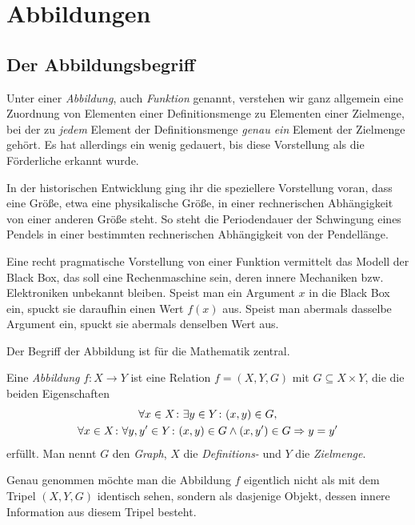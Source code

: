 \newpage
\section{Abbildungen}

\subsection{Der Abbildungsbegriff}

Unter einer \emph{Abbildung}, auch \emph{Funktion}%
 genannt, verstehen wir ganz allgemein eine Zuordnung von
Elementen einer Definitionsmenge zu Elementen einer Zielmenge, bei der
zu \emph{jedem} Element der Definitionsmenge \emph{genau ein} Element
der Zielmenge gehört. Es hat allerdings ein wenig gedauert, bis
diese Vorstellung als die Förderliche erkannt wurde.

In der historischen Entwicklung ging ihr die speziellere Vorstellung
voran, dass eine Größe, etwa eine physikalische Größe, in einer
rechnerischen Abhängigkeit von einer anderen Größe steht. So steht
die Periodendauer der Schwingung eines Pendels in einer bestimmten
rechnerischen Abhängigkeit von der Pendellänge.

Eine recht pragmatische Vorstellung von einer Funktion vermittelt das Modell
der Black Box, das soll eine Rechenmaschine sein, deren innere Mechaniken
bzw. Elektroniken unbekannt bleiben. Speist man ein Argument $x$ in die
Black Box ein, spuckt sie daraufhin einen Wert $f(x)$ aus. Speist man
abermals dasselbe Argument ein, spuckt sie abermals denselben Wert aus.

Der Begriff der Abbildung ist für die Mathematik zentral.

\begin{Definition}[Abbildung]\newlinefirst
Eine \emph{Abbildung} $f\colon X\to Y$ ist eine Relation $f=(X,Y,G)$ mit
$G\subseteq X\times Y$, die die beiden Eigenschaften
\begin{gather*}
\forall x\in X\colon\exists y\in Y\colon (x,y)\in G,\\
\forall x\in X\colon\forall y,y'\in Y\colon (x,y)\in G\land (x,y')\in G\Rightarrow y=y'
\end{gather*}
erfüllt. Man nennt $G$ den \emph{Graph}, $X$ die \emph{Definitions-} und
$Y$ die \emph{Zielmenge}.
\end{Definition}
Genau genommen möchte man die Abbildung $f$ eigentlich nicht als mit
dem Tripel $(X,Y,G)$ identisch sehen, sondern als dasjenige Objekt,
dessen innere Information aus diesem Tripel besteht.

